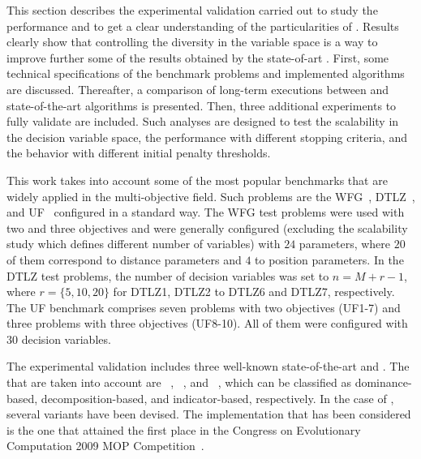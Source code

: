 This section describes the experimental validation carried out to study the performance and
to get a clear understanding of the particularities of \VSDMOEA{}.
%
Results clearly show that controlling the diversity in the variable space is a way to improve further some of the results 
obtained by the state-of-art \MOEAS{}.
%
First, some technical specifications of the benchmark problems and implemented algorithms are discussed.
%
Thereafter, a comparison of long-term executions between \VSDMOEA{} and state-of-the-art algorithms is presented.
%
Then, three additional experiments to fully validate \VSDMOEA{} are included.
%
Such analyses are designed to test the scalability in the decision variable space, the performance with different stopping criteria, 
and the behavior with different initial penalty thresholds.

This work takes into account some of the most popular benchmarks that are widely applied in the multi-objective field.
%
Such problems are the WFG~\cite{Joel:WFG}, DTLZ~\cite{Joel:DTLZ}, and UF~\cite{Joel:CEC2009} configured in a 
standard way.
%
The WFG test problems were used with two and three objectives and 
were generally configured (excluding the scalability study which defines different number of variables) with $24$ parameters, where $20$ of them correspond to distance parameters and $4$ to position parameters.
%
In the DTLZ test problems, the number of decision variables was set to $n=M+r-1$, where $r=\{5, 10, 20\}$ for DTLZ1, DTLZ2 to DTLZ6 and DTLZ7, respectively.
% 
The UF benchmark comprises seven problems with two objectives (UF1-7) and three problems with three objectives (UF8-10).
%
All of them were configured with $30$ decision variables.

The experimental validation includes three well-known state-of-the-art \MOEAS{} and \VSDMOEA{}.
%
The \MOEAS{} that are taken into account are \NSGAII{}~\cite{Joel:jMetal}, \MOEAD{}~\cite{MOEADCode}, and \RMOEA{}~\cite{R2EMOACode}, 
which can be classified as dominance-based, decomposition-based, and indicator-based, respectively.
%
In the case of \MOEAD{}, several variants have been devised.
%
The \MOEAD{} implementation that has been considered is the one that attained the first place in the Congress on Evolutionary Computation 
2009 MOP Competition~\cite{zhang2009performance}.


